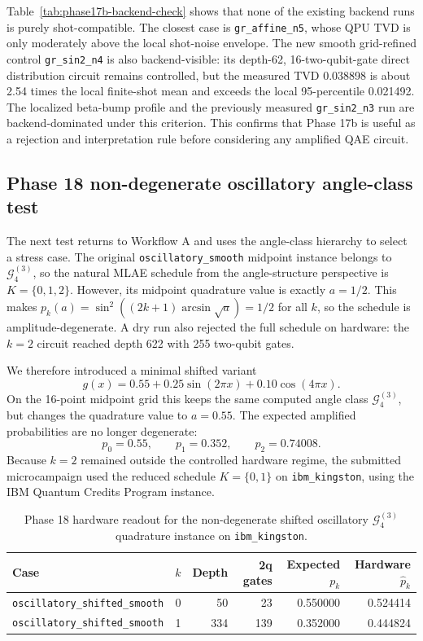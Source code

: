 Table~\ref{tab:phase17b-backend-check} shows that none of the existing backend
runs is purely shot-compatible. The closest case is
\texttt{gr\_affine\_n5}, whose QPU TVD is only moderately above the local
shot-noise envelope. The new smooth grid-refined control
\texttt{gr\_sin2\_n4} is also backend-visible: its depth-62, 16-two-qubit-gate
direct distribution circuit remains controlled, but the measured TVD
0.038898 is about 2.54 times the local finite-shot mean and exceeds the local
95-percentile 0.021492. The localized beta-bump profile and the previously
measured \texttt{gr\_sin2\_n3} run are backend-dominated under this criterion.
This confirms that Phase 17b is useful as a rejection and interpretation rule
before considering any amplified QAE circuit.

\subsection{Phase 18 non-degenerate oscillatory angle-class test}
\label{subsec:phase18-oscillatory-shifted}

The next test returns to Workflow A and uses the angle-class hierarchy to select
a stress case. The original \texttt{oscillatory\_smooth} midpoint instance
belongs to \(\mathcal{G}^{(3)}_4\), so the natural MLAE schedule from the
angle-structure perspective is \(K=\{0,1,2\}\). However, its midpoint
quadrature value is exactly \(a=1/2\). This makes
\(p_k(a)=\sin^2((2k+1)\arcsin\sqrt a)=1/2\) for all \(k\), so the schedule is
amplitude-degenerate. A dry run also rejected the full schedule on hardware:
the \(k=2\) circuit reached depth 622 with 255 two-qubit gates.

We therefore introduced a minimal shifted variant
\[
  g(x)=0.55+0.25\sin(2\pi x)+0.10\cos(4\pi x).
\]
On the 16-point midpoint grid this keeps the same computed angle class
\(\mathcal{G}^{(3)}_4\), but changes the quadrature value to \(a=0.55\).
The expected amplified probabilities are no longer degenerate:
\[
  p_0=0.55,\qquad p_1=0.352,\qquad p_2=0.74008.
\]
Because \(k=2\) remained outside the controlled hardware regime, the submitted
microcampaign used the reduced schedule \(K=\{0,1\}\) on
\texttt{ibm\_kingston}, using the IBM Quantum Credits Program instance.

\begin{table}[h]
\centering
\begin{tabular}{lrrrrr}
\toprule
Case & \(k\) & Depth & 2q gates & Expected \(p_k\) & Hardware \(\hat p_k\) \\
\midrule
\texttt{oscillatory\_shifted\_smooth} & 0 & 50 & 23 & 0.550000 & 0.524414 \\
\texttt{oscillatory\_shifted\_smooth} & 1 & 334 & 139 & 0.352000 & 0.444824 \\
\bottomrule
\end{tabular}
\caption{Phase 18 hardware readout for the non-degenerate shifted oscillatory
\(\mathcal{G}^{(3)}_4\) quadrature instance on \texttt{ibm\_kingston}.}
\label{tab:phase18-oscillatory-shifted}
\end{table}

